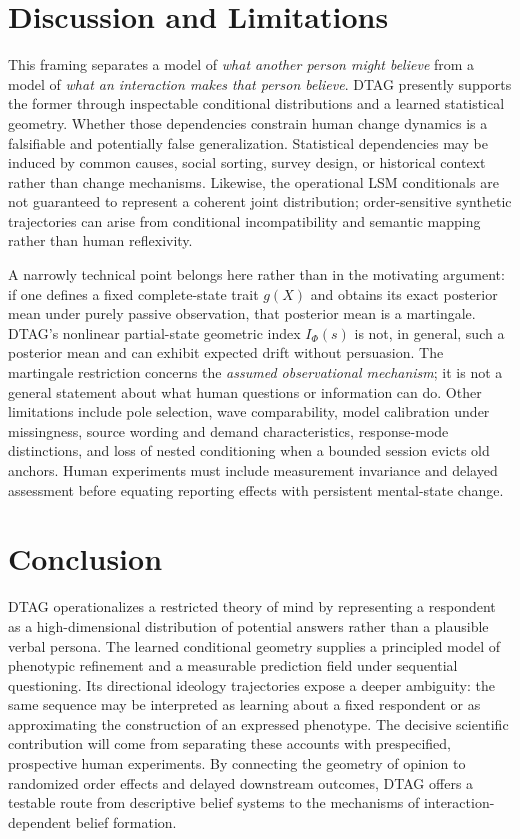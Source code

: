 \documentclass[journal,10pt]{IEEEtran}
\newcommand{\Ph}{\Phi}
\begin{document}
\section{Discussion and Limitations}
This framing separates a model of \emph{what another person might believe} from a model of \emph{what an interaction makes that person believe}. DTAG presently supports the former through inspectable conditional distributions and a learned statistical geometry. Whether those dependencies constrain human change dynamics is a falsifiable and potentially false generalization. Statistical dependencies may be induced by common causes, social sorting, survey design, or historical context rather than change mechanisms. Likewise, the operational LSM conditionals are not guaranteed to represent a coherent joint distribution; order-sensitive synthetic trajectories can arise from conditional incompatibility and semantic mapping rather than human reflexivity.

A narrowly technical point belongs here rather than in the motivating argument: if one defines a fixed complete-state trait $g(X)$ and obtains its exact posterior mean under purely passive observation, that posterior mean is a martingale. DTAG's nonlinear partial-state geometric index $I_\Ph(s)$ is not, in general, such a posterior mean and can exhibit expected drift without persuasion. The martingale restriction concerns the \emph{assumed observational mechanism}; it is not a general statement about what human questions or information can do. Other limitations include pole selection, wave comparability, model calibration under missingness, source wording and demand characteristics, response-mode distinctions, and loss of nested conditioning when a bounded session evicts old anchors. Human experiments must include measurement invariance and delayed assessment before equating reporting effects with persistent mental-state change.

\section{Conclusion}
DTAG operationalizes a restricted theory of mind by representing a respondent as a high-dimensional distribution of potential answers rather than a plausible verbal persona. The learned conditional geometry supplies a principled model of phenotypic refinement and a measurable prediction field under sequential questioning. Its directional ideology trajectories expose a deeper ambiguity: the same sequence may be interpreted as learning about a fixed respondent or as approximating the construction of an expressed phenotype. The decisive scientific contribution will come from separating these accounts with prespecified, prospective human experiments. By connecting the geometry of opinion to randomized order effects and delayed downstream outcomes, DTAG offers a testable route from descriptive belief systems to the mechanisms of interaction-dependent belief formation.
\end{document}
